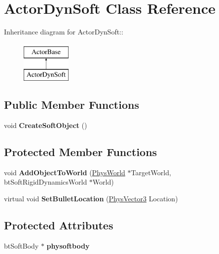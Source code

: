 \hypertarget{classActorDynSoft}{
\section{ActorDynSoft Class Reference}
\label{dc/de0/classActorDynSoft}
}
Inheritance diagram for ActorDynSoft::\begin{figure}[H]
\begin{center}
\leavevmode
\includegraphics[height=2cm]{dc/de0/classActorDynSoft}
\end{center}
\end{figure}
\subsection*{Public Member Functions}
\begin{DoxyCompactItemize}
\item 
\hypertarget{classActorDynSoft_a249bc0621b1d55ea0a9c7787605078d6}{
void {\bfseries CreateSoftObject} ()}
\label{dc/de0/classActorDynSoft_a249bc0621b1d55ea0a9c7787605078d6}

\end{DoxyCompactItemize}
\subsection*{Protected Member Functions}
\begin{DoxyCompactItemize}
\item 
\hypertarget{classActorDynSoft_ab56b961689401e16962d653b977e5fd6}{
void {\bfseries AddObjectToWorld} (\hyperlink{classPhysWorld}{PhysWorld} $\ast$TargetWorld, btSoftRigidDynamicsWorld $\ast$World)}
\label{dc/de0/classActorDynSoft_ab56b961689401e16962d653b977e5fd6}

\item 
\hypertarget{classActorDynSoft_aaf548f7849f59956c10d79420efafffb}{
virtual void {\bfseries SetBulletLocation} (\hyperlink{classPhysVector3}{PhysVector3} Location)}
\label{dc/de0/classActorDynSoft_aaf548f7849f59956c10d79420efafffb}

\end{DoxyCompactItemize}
\subsection*{Protected Attributes}
\begin{DoxyCompactItemize}
\item 
\hypertarget{classActorDynSoft_a9f5b3e1cfa400bb6095f77feb81e76d8}{
btSoftBody $\ast$ {\bfseries physoftbody}}
\label{dc/de0/classActorDynSoft_a9f5b3e1cfa400bb6095f77feb81e76d8}

\end{DoxyCompactItemize}


